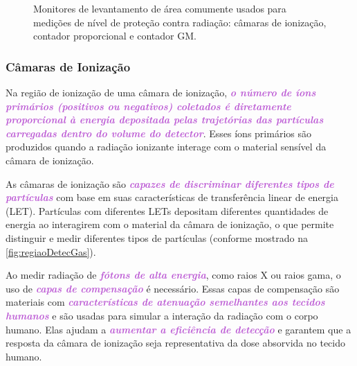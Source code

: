 \documentclass[11pt,a4paper]{article}
\begin{document}
	\begin{figure}[h]
		\centering
		\caption{Monitores de levantamento de área comumente usados para medições de nível de proteção contra radiação: câmaras de ionização, contador proporcional e contador GM.}
		\label{fig:monitoresDeAreaGaS}
	\end{figure}
	
\subsubsection*{Câmaras de Ionização}

	Na região de ionização de uma câmara de ionização, \textcolor{MediumOrchid}{\textit{\textbf{o número de íons primários (positivos ou negativos) coletados é diretamente proporcional à energia depositada pelas trajetórias das partículas carregadas dentro do volume do detector}}}. Esses íons primários são produzidos quando a radiação ionizante interage com o material sensível da câmara de ionização.

	As câmaras de ionização são \textcolor{MediumOrchid}{\textit{\textbf{capazes de discriminar diferentes tipos de partículas}}} com base em suas características de transferência linear de energia (LET). Partículas com diferentes LETs depositam diferentes quantidades de energia ao interagirem com o material da câmara de ionização, o que permite distinguir e medir diferentes tipos de partículas (conforme mostrado na \ref{fig:regiaoDetecGas}).

	Ao medir radiação de\textcolor{MediumOrchid}{\textit{\textbf{ fótons de alta energia}}}, como raios X ou raios gama, o uso de \textcolor{MediumOrchid}{\textit{\textbf{capas de compensação}}} é necessário. Essas capas de compensação são materiais com \textcolor{MediumOrchid}{\textit{\textbf{características de atenuação semelhantes aos tecidos humanos}}} e são usadas para simular a interação da radiação com o corpo humano. Elas ajudam a \textcolor{MediumOrchid}{\textit{\textbf{aumentar a eficiência de detecção}}} e garantem que a resposta da câmara de ionização seja representativa da dose absorvida no tecido humano.
\end{document}
